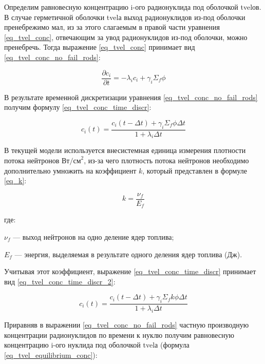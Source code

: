 Определим равновесную концентрацию i-ого радионуклида под оболочкой \ac{tvel}ов. В случае герметичной оболочки 
\ac{tvel}а выход радионуклидов из-под оболочки пренебрежимо мал, из за этого слагаемым в правой части уравнения 
\ref{eq_tvel_conc}, отвечающим за увод радионуклидов из-под оболочки, можно пренебречь. Тогда выражение 
\ref{eq_tvel_conc} принимает вид \ref{eq_tvel_conc_no_fail_rods}: 

\begin{equation}
    \label{eq_tvel_conc_no_fail_rods}
    \frac{\partial c_{i}}{\partial t} = -\lambda_{i}c_{i} + \gamma_{i}\Sigma_{f}\phi
\end{equation}

В результате временной дискретизации уравнения \ref{eq_tvel_conc_no_fail_rods} получим формулу \ref{eq_tvel_conc_time_discr}:

\begin{equation}
    \label{eq_tvel_conc_time_discr}
    c_{i}(t) = \frac{c_{i}(t - \Delta t) + \gamma_{i} \Sigma_{f} \phi \Delta t}{1 + \lambda_{i} \Delta t}
\end{equation}

В текущей модели используется внесистемная единица измерения плотности потока нейтронов $\text{Вт/см}^{2}$, из-за чего 
плотность потока нейтронов необходимо дополнительно умножить на коэффициент $k$, который представлен в формуле 
\ref{eq_k}:

\begin{equation}
    \label{eq_k}
    k = \frac{\nu_{f}}{E_{f}}
\end{equation}

где:
\begin{description}
    \item $\nu_{f}$ --- выход нейтронов на одно деление ядер топлива;
    \item $E_{f}$ --- энергия, выделяемая в результате одного деления ядер топлива (Дж).
\end{description}

Учитывая этот коэффициент, выражение \ref{eq_tvel_conc_time_discr} принимает вид \ref{eq_tvel_conc_time_discr_2}:

\begin{equation}
    \label{eq_tvel_conc_time_discr_2}
    c_{i}(t) = \frac{c_{i}(t - \Delta t) + \gamma_{i} \Sigma_{f} k \phi \Delta t}{1 + \lambda_{i} \Delta t}
\end{equation}

Приравняв в выражении \ref{eq_tvel_conc_no_fail_rods} частную производную концентрации радионуклидов по времени к 
нуклю получим равновесную концентрацию i-ого нуклида под оболочкой \ac{tvel}а (формула \ref{eq_tvel_equilibrium_conc}):

